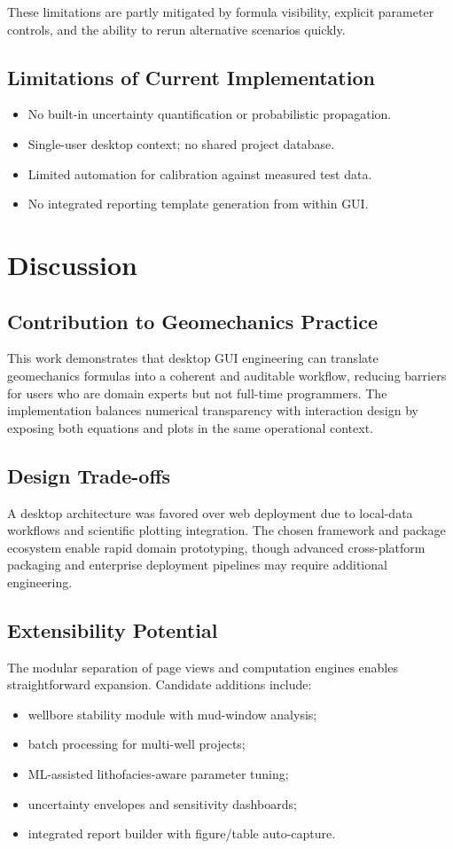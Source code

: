 \documentclass[12pt,a4paper]{report}
\begin{document}
These limitations are partly mitigated by formula visibility, explicit parameter controls, and the ability to rerun alternative scenarios quickly.

\section{Limitations of Current Implementation}
\begin{itemize}
    \item No built-in uncertainty quantification or probabilistic propagation.
    \item Single-user desktop context; no shared project database.
    \item Limited automation for calibration against measured test data.
    \item No integrated reporting template generation from within GUI.
\end{itemize}

\chapter{Discussion}
\section{Contribution to Geomechanics Practice}
This work demonstrates that desktop GUI engineering can translate geomechanics formulas into a coherent and auditable workflow, reducing barriers for users who are domain experts but not full-time programmers. The implementation balances numerical transparency with interaction design by exposing both equations and plots in the same operational context.

\section{Design Trade-offs}
A desktop architecture was favored over web deployment due to local-data workflows and scientific plotting integration. The chosen framework and package ecosystem enable rapid domain prototyping, though advanced cross-platform packaging and enterprise deployment pipelines may require additional engineering.

\section{Extensibility Potential}
The modular separation of page views and computation engines enables straightforward expansion. Candidate additions include:
\begin{itemize}
    \item wellbore stability module with mud-window analysis;
    \item batch processing for multi-well projects;
    \item ML-assisted lithofacies-aware parameter tuning;
    \item uncertainty envelopes and sensitivity dashboards;
    \item integrated report builder with figure/table auto-capture.
\end{itemize}
\end{document}
